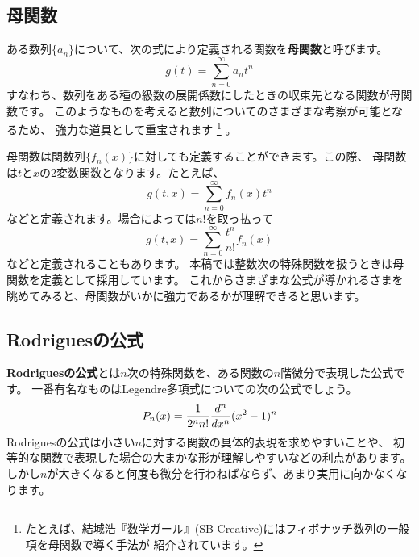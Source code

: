 \documentclass[../main/main]{subfiles}
\begin{document}
\subsection*{母関数}
ある数列$\{ a_n \}$について、次の式により定義される関数を\textbf{母関数}と呼びます。
\begin{equation*}
  g(t) = \sum_{n=0}^\infty a_n t^n
\end{equation*}
すなわち、数列をある種の級数の展開係数にしたときの収束先となる関数が母関数です。
このようなものを考えると数列についてのさまざまな考察が可能となるため、
強力な道具として重宝されます
\footnote{
たとえば、結城浩『数学ガール』(SB Creative)にはフィボナッチ数列の一般項を母関数で導く手法が
紹介されています。
}
。

母関数は関数列$\{ f_n(x) \}$に対しても定義することができます。この際、
母関数は$t$と$x$の2変数関数となります。たとえば、
\begin{equation*}
  g(t, x) = \sum_{n=0}^\infty f_n(x) t^n
\end{equation*}
などと定義されます。場合によっては$n!$を取っ払って
\begin{equation*}
  g(t, x) = \sum_{n=0}^\infty \frac{t^n}{n!} f_n(x)
\end{equation*}
などと定義されることもあります。
本稿では整数次の特殊関数を扱うときは母関数を定義として採用しています。
これからさまざまな公式が導かれるさまを眺めてみると、母関数がいかに強力であるかが理解できると思います。

\subsection*{Rodriguesの公式}
\textbf{Rodriguesの公式}とは$n$次の特殊関数を、ある関数の$n$階微分で表現した公式です。
一番有名なものはLegendre多項式についての次の公式でしょう。
\begin{equation*}
  P_n (x) = \frac{1}{2^n n!} {\frac{d^{n}}{dx^{n}}} (x^2 - 1)^n
\end{equation*}
Rodriguesの公式は小さい$n$に対する関数の具体的表現を求めやすいことや、
初等的な関数で表現した場合の大まかな形が理解しやすいなどの利点があります。
しかし$n$が大きくなると何度も微分を行わねばならず、あまり実用に向かなくなります。
\end{document}

